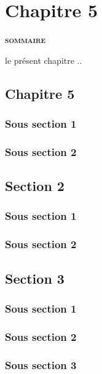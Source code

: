 \chapter{Chapitre 5}
\label{chap:chap5}


\vspace{20pt}
\begin{center} {\scshape\bfseries sommaire} \end{center}
\startcontents[chapters]

\smash{\rule{\textwidth}{.4pt}}
\smash{\rule{\textwidth}{.4pt}}

\vspace{20pt}


 le présent chapitre ..


\section{Chapitre 5}

\subsection{Sous section 1}
\subsection{Sous section 2}

\section{Section 2}

\subsection{Sous section 1}
\subsection{Sous section 2}

\section{Section 3}

\subsection{Sous section 1}
\subsection{Sous section 2}
\subsection{Sous section 3}
